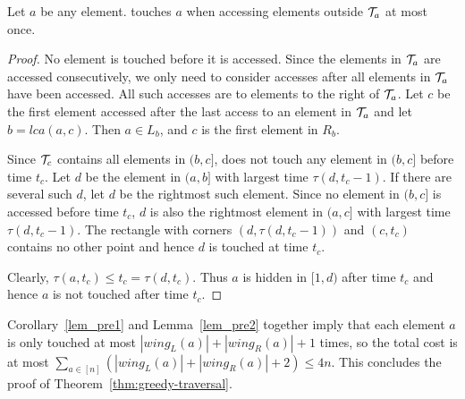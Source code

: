 \begin{lemma}\label{lem_pre2} Let $a$ be any element. \greedy touches $a$ when accessing elements outside ${\mathcal T}_a$ at most once. \end{lemma}
\begin{proof}
No element is touched before it is accessed. Since the elements in ${\mathcal T}_a$ are accessed consecutively, we only need to consider accesses after all elements in ${\mathcal T}_a$ have been accessed. All such accesses are to elements to the right of ${\mathcal T}_a$. Let $c$ be the first element accessed after the last access to an element in ${\mathcal T}_a$ and let $b = \mathit{lca}(a,c)$. Then $a \in L_b$, and $c$ is the first element in $R_b$. 

Since ${\mathcal T}_c$ contains all elements in $(b,c]$, \greedy does not touch any element in $(b,c]$ before time $t_c$. Let $d$ be the element in $(a,b]$ with largest time $\tau(d,t_c-1)$. If there are several such $d$, let $d$ be the rightmost such element. Since no element in $(b,c]$ is accessed before time $t_c$, $d$ is also the rightmost element in $(a,c]$ with largest time $\tau(d,t_c-1)$. The rectangle with corners $(d,\tau(d,t_c-1))$ and $(c,t_c)$ contains no other point and hence $d$ is touched at time $t_c$. 

Clearly, $\tau(a,t_c) \le t_c = \tau(d,t_c)$. Thus $a$ is hidden in $[1,d)$ after time $t_c$ and hence $a$ is not touched after time $t_c$. 
\end{proof} 



Corollary~\ref{lem_pre1} and Lemma~\ref{lem_pre2} together imply that each element $a$ is only touched at most $|wing_L(a)| + |wing_R(a)| +1$ times, so the total cost is at most $\sum_{a \in [n]} (|wing_L(a)| + |wing_R(a)| +2) \leq 4n$.
This concludes the proof of Theorem~\ref{thm:greedy-traversal}.     
